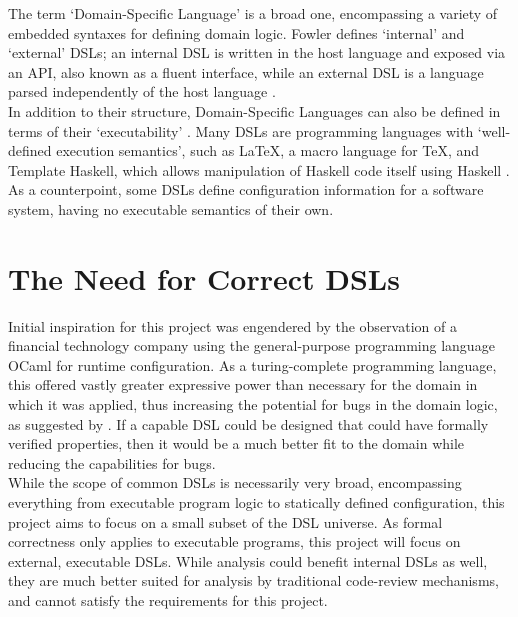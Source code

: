 \documentclass[a4paper,11pt]{report}
\begin{document}
The term `Domain-Specific Language' is a broad one, encompassing a variety of embedded syntaxes for defining domain logic.
Fowler defines `internal' and `external' DSLs; an internal DSL is written in the host language and exposed via an API, also known as a fluent interface, while an external DSL is a language parsed independently of the host language \citep{fowler2010domain}.\\

In addition to their structure, Domain-Specific Languages can also be defined in terms of their `executability' \citep{Mernik:2005:DDL:1118890.1118892}.
Many DSLs are programming languages with `well-defined execution semantics', such as \LaTeX, a macro language for \TeX, and Template Haskell, which allows manipulation of Haskell code itself using Haskell \citep{sheard2002template}.
As a counterpoint, some DSLs define configuration information for a software system, having no executable semantics of their own.


\section{The Need for Correct DSLs} %
\label{sec:the_need_for_correct_dsls}
Initial inspiration for this project was engendered by the observation of a financial technology company using the general-purpose programming language OCaml for runtime configuration.
As a turing-complete programming language, this offered vastly greater expressive power than necessary for the domain in which it was applied, thus increasing the potential for bugs in the domain logic, as suggested by \cite{subramanyam2003empirical}.
If a capable DSL could be designed that could have formally verified properties, then it would be a much better fit to the domain while reducing the capabilities for bugs.\\

While the scope of common DSLs is necessarily very broad, encompassing everything from executable program logic to statically defined configuration, this project aims to focus on a small subset of the DSL universe.
As formal correctness only applies to executable programs, this project will focus on external, executable DSLs. 
While analysis could benefit internal DSLs as well, they are much better suited for analysis by traditional code-review mechanisms, and cannot satisfy the requirements for this project.\\
\end{document}
